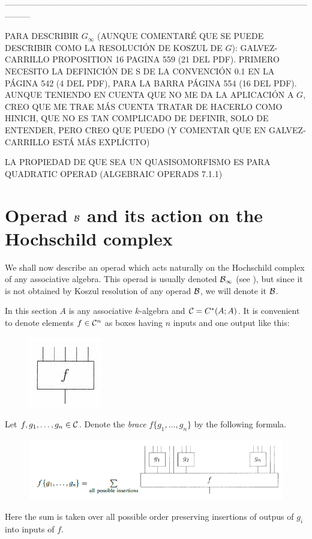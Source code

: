 \documentclass[TFM.tex]{subfiles}
\begin{document}
---------------------------------------------------------------------------------------------------------------------

PARA DESCRIBIR $G_\infty$ (AUNQUE COMENTARÉ QUE SE PUEDE DESCRIBIR COMO LA RESOLUCIÓN DE KOSZUL DE $G$): GALVEZ-CARRILLO PROPOSITION 16 PAGINA 559 (21 DEL PDF). PRIMERO NECESITO LA DEFINICIÓN DE S DE LA CONVENCIÓN 0.1 EN LA PÁGINA 542 (4 DEL PDF), PARA LA BARRA PÁGINA 554 (16 DEL PDF). AUNQUE TENIENDO EN CUENTA QUE NO ME DA LA APLICACIÓN A $G$, CREO QUE ME TRAE MÁS CUENTA TRATAR DE HACERLO COMO HINICH, QUE NO ES TAN COMPLICADO DE DEFINIR, SOLO DE ENTENDER, PERO CREO QUE PUEDO (Y COMENTAR QUE EN GALVEZ-CARRILLO ESTÁ MÁS EXPLÍCITO)

LA PROPIEDAD DE QUE SEA UN QUASISOMORFISMO ES PARA QUADRATIC OPERAD (ALGEBRAIC OPERADS 7.1.1)

\section{Operad $\mathcal{B}$ and its action on the Hochschild complex}
We shall now describe an operad which
acts naturally on the Hochschild complex of any associative algebra. This operad is
usually denoted $\mathcal{B}_\infty$ (see \cite{Hinich}), but since it is not obtained by Koszul resolution of any operad $\mathcal{B}$, we will denote it $\mathcal{B}$. 

In this section $A$ is any associative $k$-algebra and $\mathcal{C}=C^*(A;A)$.
It is convenient to denote elements $f \in \mathcal{C}^n$ as boxes having $n$ inputs and one output like
this:

\begin{figure}[h!]
\includegraphics[scale=0.9]{Imagenes//box}
\end{figure}


\begin{defi}
Let $f,g_1,\dots, g_n\in \mathcal{C}$. Denote the \emph{brace} $f\{g_1,\dots, g_n\}$ by the following formula.

\begin{figure}[h!]
\includegraphics[scale=0.7]{Imagenes//brace}
\end{figure}

Here the sum is taken over all possible order preserving insertions of outpus of $g_i$ into
inputs of $f$.
\end{defi}
\end{document}
